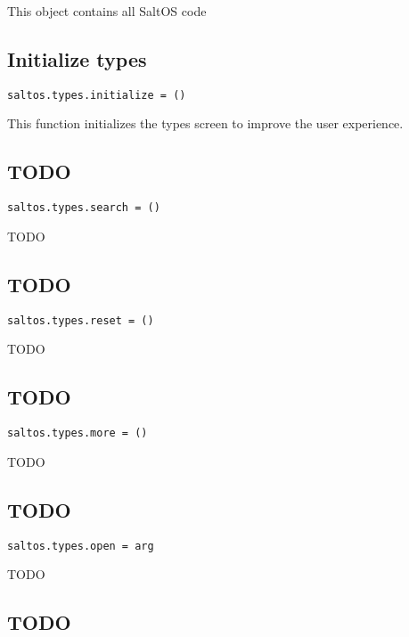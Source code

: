 \documentclass[a4paper]{book}
\begin{document}
This object contains all SaltOS code

\hypertarget{toc132}{}
\subsection{Initialize types}

\begin{lstlisting}
saltos.types.initialize = ()
\end{lstlisting}

This function initializes the types screen to improve the user experience.

\hypertarget{toc133}{}
\subsection{TODO}

\begin{lstlisting}
saltos.types.search = ()
\end{lstlisting}

TODO

\hypertarget{toc134}{}
\subsection{TODO}

\begin{lstlisting}
saltos.types.reset = ()
\end{lstlisting}

TODO

\hypertarget{toc135}{}
\subsection{TODO}

\begin{lstlisting}
saltos.types.more = ()
\end{lstlisting}

TODO

\hypertarget{toc136}{}
\subsection{TODO}

\begin{lstlisting}
saltos.types.open = arg
\end{lstlisting}

TODO

\hypertarget{toc137}{}
\subsection{TODO}
\end{document}
